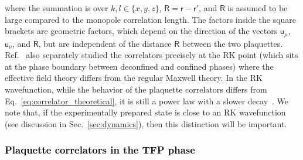 \documentclass[twocolumn,superscriptaddress,amsmath,amssymb,aps,prx,nofootinbib]{revtex4-2}
\newcommand{\dual}[1]{\boldsymbol{\mathsf{#1}}}
\newcommand{\newtext}[1]{\textcolor{black}{#1}}
\begin{document}
where the summation is over $k,l \in \{ x,y,z \}$, $\dual{R} = \dual{r} - \dual{r}'$, and $\mathsf{R}$ is assumed to be large compared to the monopole correlation length. The factors inside the square brackets are geometric factors, which depend on the direction of the vectors $\dual{u}_\mu$, $\dual{u}_\nu$, and $\dual{R}$, but are  independent of the distance $\mathsf{R}$ between the two plaquettes. Ref.~\cite{hermele2004} also separately studied the correlators precisely at the RK point (which sits at the phase boundary between deconfined and confined phases) where the effective field theory differs from the regular Maxwell theory. In the RK wavefunction, while the behavior of the plaquette correlators differs from Eq.~\eqref{eq:correlator_theoretical}, it is still a power law with a slower decay~\cite{hermele2004}. We note that, if the experimentally prepared state is close to an RK wavefunction (see discussion in Sec.~\ref{sec:dynamics}), then this distinction will be important.

\newtext{\subsubsection{Plaquette correlators in the TFP phase}}
\end{document}
